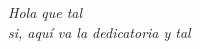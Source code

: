 \begin{dedication}
    \textit{
        Hola que tal\\
        si, aquí va la dedicatoria y tal}
\end{dedication}